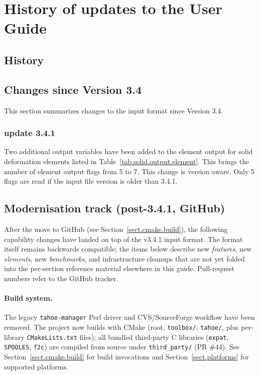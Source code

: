 
\section{History of updates to the \tahoe User Guide}

\subsection{History}
\subsection{Changes since Version 3.4}
\label{sect.changes.log}
This section summarizes changes to the \tahoe input format
since Version 3.4.
\subsubsection{update 3.4.1}
Two additional output variables have been added to the element output
for solid deformation elements listed in
Table~\ref{tab.solid.output.element}. This brings the number of
element output flags from 5 to 7. This change is version aware. Only 5
flags are read if the input file version is older than 3.4.1.

\subsection{Modernisation track (post-3.4.1, GitHub)}
\label{sect.changes.modern}
After the move to GitHub (see Section~\ref{sect.cmake.build}), the
following capability changes have landed on top of the v3.4.1 input
format.  The format itself remains backwards compatible; the items
below describe new \emph{features}, new \emph{elements}, new
\emph{benchmarks}, and infrastructure cleanups that are not yet
folded into the per-section reference material elsewhere in this
guide.  Pull-request numbers refer to the GitHub tracker.

\paragraph{Build system.}
The legacy \texttt{tahoe-manager} Perl driver and CVS/SourceForge
workflow have been removed.  The project now builds with CMake (root,
\texttt{toolbox/}, \texttt{tahoe/}, plus per-library
\texttt{CMakeLists.txt} files); all bundled third-party C libraries
(\texttt{expat}, \texttt{SPOOLES}, \texttt{f2c}) are compiled from
source under \texttt{third\_party/} (PR \#44).  See
Section~\ref{sect.cmake.build} for build invocations and
Section~\ref{sect.platforms} for supported platforms.

